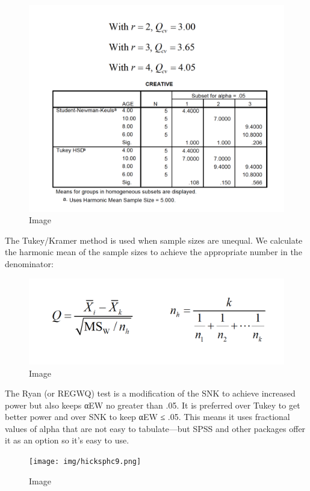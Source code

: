 \documentclass[]{book}
\theoremstyle{definition}
\theoremstyle{definition}
\theoremstyle{definition}
\theoremstyle{remark}
\begin{document}
\begin{figure}
\centering
\includegraphics{img/hicksphc7.png}
\caption{Image}
\end{figure}

The Tukey/Kramer method is used when sample sizes are unequal. We
calculate the harmonic mean of the sample sizes to achieve the
appropriate number in the denominator:

\begin{figure}
\centering
\includegraphics{img/hicksphc8.png}
\caption{Image}
\end{figure}

The Ryan (or REGWQ) test is a modification of the SNK to achieve
increased power but also keeps αEW no greater than .05. It is preferred
over Tukey to get better power and over SNK to keep αEW ≤ .05. This
means it uses fractional values of alpha that are not easy to
tabulate---but SPSS and other packages offer it as an option so it's
easy to use.

\begin{figure}
\centering
\texttt{[image: img/hicksphc9.png]}
\caption{Image}
\end{figure}
\end{document}
